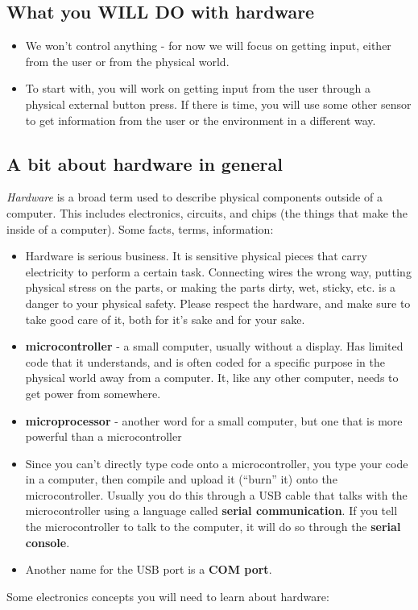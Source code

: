 \documentclass[letterpaper,10pt,english]{/usr/local/lib/python2.7/dist-packages/sphinx/texinputs/sphinxhowto}
\begin{document}
\subsection{What you WILL DO with hardware}

\begin{itemize}
\item
  We won't control anything - for now we will focus on getting input,
  either from the user or from the physical world.
\item
  To start with, you will work on getting input from the user through a
  physical external button press. If there is time, you will use some
  other sensor to get information from the user or the environment in a
  different way.
\end{itemize}\subsection{A bit about hardware in general}

\emph{Hardware} is a broad term used to describe physical components
outside of a computer. This includes electronics, circuits, and chips
(the things that make the inside of a computer). Some facts, terms,
information:

\begin{itemize}
\item
  Hardware is serious business. It is sensitive physical pieces that
  carry electricity to perform a certain task. Connecting wires the
  wrong way, putting physical stress on the parts, or making the parts
  dirty, wet, sticky, etc. is a danger to your physical safety. Please
  respect the hardware, and make sure to take good care of it, both for
  it's sake and for your sake.
\item
  \textbf{microcontroller} - a small computer, usually without a
  display. Has limited code that it understands, and is often coded for
  a specific purpose in the physical world away from a computer. It,
  like any other computer, needs to get power from somewhere.
\item
  \textbf{microprocessor} - another word for a small computer, but one
  that is more powerful than a microcontroller
\item
  Since you can't directly type code onto a microcontroller, you type
  your code in a computer, then compile and upload it (``burn'' it) onto
  the microcontroller. Usually you do this through a USB cable that
  talks with the microcontroller using a language called \textbf{serial
  communication}. If you tell the microcontroller to talk to the
  computer, it will do so through the \textbf{serial console}.
\item
  Another name for the USB port is a \textbf{COM port}.
\end{itemize}
Some electronics concepts you will need to learn about hardware:
\end{document}

